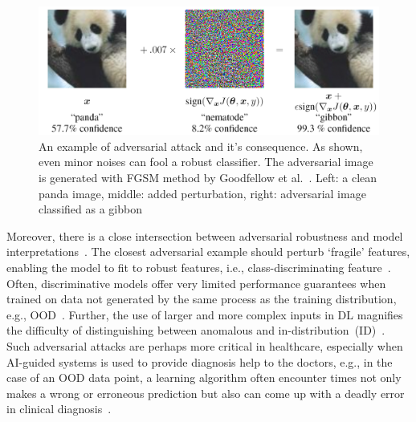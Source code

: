 \begin{figure}
    \centering
    \includegraphics[scale=0.8]{images/panda_adversary.png}
    \caption[An example of adversarial attack and it's consequence]{An example of adversarial attack and it's consequence. As shown, even minor noises can fool a robust classifier. The adversarial image is generated with FGSM method by Goodfellow et al.~\cite{goodfellow2014explaining}. Left: a clean panda image, middle: added perturbation, right: adversarial image classified as a gibbon}
    \label{fig:fgsm_example}
    \vspace{-4mm}
\end{figure}

\hspace*{3.5mm} Moreover, there is a close intersection between adversarial robustness and model interpretations~\cite{bhatt2020explainable,sharma2019certifai}. The closest adversarial example should perturb `fragile' features, enabling the model to fit to robust features, i.e., class-discriminating feature~\cite{bhatt2020explainable}. Often, discriminative models offer very limited performance guarantees when trained on data not generated by the same process as the training distribution, e.g., OOD~\cite{OOD1}. Further, the use of larger and more complex inputs in DL magnifies the difficulty of distinguishing between anomalous and in-distribution~(ID)~\cite{OOD5}. Such adversarial attacks are perhaps more critical in healthcare, especially when AI-guided systems is used to provide diagnosis help to the doctors, e.g., in the case of an OOD data point, a learning algorithm often encounter times not only makes a wrong or erroneous prediction but also can come up with a deadly error in clinical diagnosis~\cite{OOD1}. 

